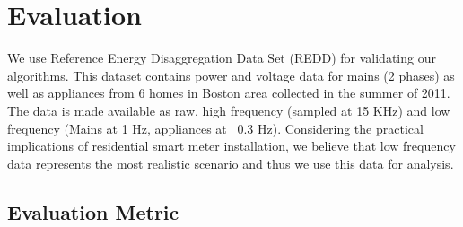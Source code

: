 \documentclass[conference]{IEEEtran}
\newcommand{\figref}[1]{Figure~\ref{#1}}
\begin{document}
\section{Evaluation}

We use Reference Energy Disaggregation Data Set (REDD) \cite{redd} for validating our algorithms. This dataset contains power and voltage data for mains (2 phases) as well as appliances from 6 homes in Boston area collected in the summer of 2011. The data is made available as raw, high frequency (sampled at 15 KHz) and low frequency (Mains at 1 Hz, appliances at ~0.3 Hz). Considering the practical implications of residential smart meter installation, we believe that low frequency data represents the most realistic scenario and thus we use this data for analysis. 



%	
%
\subsection{Evaluation Metric}
\end{document}
